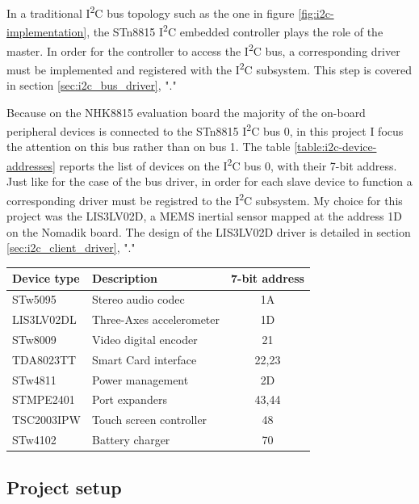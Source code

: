 \documentclass[a4paper,10pt]{article}
\makeatletter
\newenvironment{tablehere}{\def\@captype{table}}{}
\newcommand{\icc}{I\textsuperscript{2}C }
\makeatother
\begin{document}
\begin{multicols}{2}
In a traditional \icc bus topology such as the one in figure
\ref{fig:i2c-implementation}, the STn8815 \icc embedded controller plays the
role of the master. In order for the controller to access the \icc bus, a
corresponding driver must be implemented and registered with the \icc
subsystem. This step is covered in section \ref{sec:i2c_bus_driver},
"."

Because on the NHK8815 evaluation board the majority of the on-board peripheral
devices is connected to the STn8815 \icc bus 0, in this project I focus the
attention on this bus rather than on bus 1.
The table \ref{table:i2c-device-addresses} reports the list of devices on 
the \icc bus 0, with their 7-bit address.
Just like for the case of the bus driver, in order for each slave device
to function a corresponding driver must be registred to the \icc subsystem.
My choice for this project was the LIS3LV02D, a MEMS inertial sensor mapped
at the address 1D on the Nomadik board.
The design of the LIS3LV02D driver is detailed in section
\ref{sec:i2c_client_driver}, "."\\[6pt]

\begin{tablehere}
	\centering
	\renewcommand{\arraystretch}{1.2}	
	\begin{tabular}{l l c}
		\hline
		Device type & Description & 7-bit address \\
		\hline
		STw5095 & Stereo audio codec & 1A \\
		LIS3LV02DL & Three-Axes accelerometer & 1D \\
		STw8009 & Video digital encoder	 & 21 \\
		TDA8023TT & Smart Card interface & 22,23 \\
		STw4811 & Power management & 2D \\
		STMPE2401 & Port expanders & 43,44 \\
		TSC2003IPW & Touch screen controller & 48 \\
		STw4102 & Battery charger & 70 \\
		\hline
	\end{tabular}
	\caption{NHK8815 \icc device address map.}
	\label{table:i2c-device-addresses}
\end{tablehere}



\subsection{Project setup}
\label{sec:project_setup}


\end{multicols}
\end{document}

